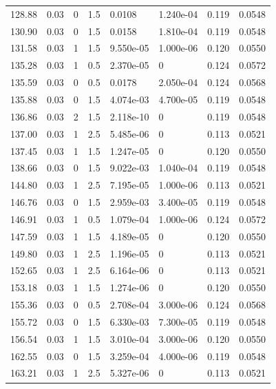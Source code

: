 \documentclass[preview]{standalone}
\begin{document}
{{{\begin{tabular}{L{1.2cm}C{1.2cm} C{0.3cm}C{0.5cm} C{1.4cm}C{1.4cm} C{1.4cm}C{1.4cm}}
  128.88  &  0.03  & 0     & 1.5 &  0.0108  & 1.240e-04  & 0.119 &  0.0548   \\ 
  130.90  &  0.03  & 0     & 1.5 &  0.0158  & 1.810e-04  & 0.119 &  0.0548   \\ 
  131.58  &  0.03  & 1     & 1.5 &  9.550e-05  & 1.000e-06  & 0.120 &  0.0550   \\ 
  135.28  &  0.03  & 1     & 0.5 &  2.370e-05  & 0  & 0.124 &  0.0572   \\ 
  135.59  &  0.03  & 0     & 0.5 &  0.0178  & 2.050e-04  & 0.124 &  0.0568   \\ 
  135.88  &  0.03  & 0     & 1.5 &  4.074e-03  & 4.700e-05  & 0.119 &  0.0548   \\ 
  136.86  &  0.03  & 2     & 1.5 &  2.118e-10  & 0  & 0.119 &  0.0548   \\ 
  137.00  &  0.03  & 1     & 2.5 &  5.485e-06  & 0  & 0.113 &  0.0521   \\ 
  137.45  &  0.03  & 1     & 1.5 &  1.247e-05  & 0  & 0.120 &  0.0550   \\ 
  138.66  &  0.03  & 0     & 1.5 &  9.022e-03  & 1.040e-04  & 0.119 &  0.0548   \\ 
  144.80  &  0.03  & 1     & 2.5 &  7.195e-05  & 1.000e-06  & 0.113 &  0.0521   \\ 
  146.76  &  0.03  & 0     & 1.5 &  2.959e-03  & 3.400e-05  & 0.119 &  0.0548   \\ 
  146.91  &  0.03  & 1     & 0.5 &  1.079e-04  & 1.000e-06  & 0.124 &  0.0572   \\ 
  147.59  &  0.03  & 1     & 1.5 &  4.189e-05  & 0  & 0.120 &  0.0550   \\ 
  149.80  &  0.03  & 1     & 2.5 &  1.196e-05  & 0  & 0.113 &  0.0521   \\ 
  152.65  &  0.03  & 1     & 2.5 &  6.164e-06  & 0  & 0.113 &  0.0521   \\ 
  153.18  &  0.03  & 1     & 1.5 &  1.274e-06  & 0  & 0.120 &  0.0550   \\ 
  155.36  &  0.03  & 0     & 0.5 &  2.708e-04  & 3.000e-06  & 0.124 &  0.0568   \\ 
  155.72  &  0.03  & 0     & 1.5 &  6.330e-03  & 7.300e-05  & 0.119 &  0.0548   \\ 
  156.54  &  0.03  & 1     & 1.5 &  3.010e-04  & 3.000e-06  & 0.120 &  0.0550   \\ 
  162.55  &  0.03  & 0     & 1.5 &  3.259e-04  & 4.000e-06  & 0.119 &  0.0548   \\ 
  163.21  &  0.03  & 1     & 2.5 &  5.327e-06  & 0  & 0.113 &  0.0521   \\ 

\end{tabular}}}}
\end{document}
